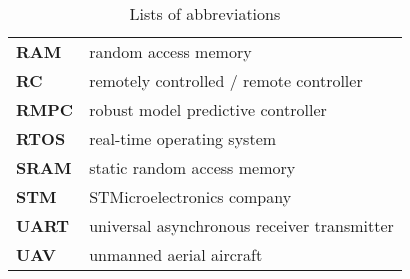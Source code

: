 \begin{table}[!htb]
\begin{tabular}{ll}
\textbf{RAM} & random access memory \\
\textbf{RC} & remotely controlled / remote controller \\
\textbf{RMPC} & robust model predictive controller \\
\textbf{RTOS} & real-time operating system \\
\textbf{SRAM} & static random access memory \\
\textbf{STM} & STMicroelectronics company \\ 
\textbf{UART} & universal asynchronous receiver transmitter \\
\textbf{UAV} & unmanned aerial aircraft \\
\hline
\end{tabular}
\caption{Lists of abbreviations}
\label{table:abbreviations}
\end{table}